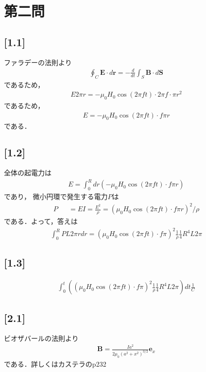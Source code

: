 \documentclass[12pt,dvipdfmx]{jsarticle}
\begin{document}
\section*{\Large{第二問}}
\subsection*{\large{[1.1]}}
ファラデーの法則より
\begin{eqnarray}
  \oint_C \bm{E}\cdot d\bm{r} = -\frac{d}{dt}\int_S \bm{B}\cdot d\bm{S}
\end{eqnarray}
であるため，
\begin{eqnarray}
  E 2\pi r= -\mu_0H_0 \cos(2\pi ft)\cdot 2\pi f \cdot \pi r^2
\end{eqnarray}
であるため，
\begin{eqnarray}
  E =  -\mu_0H_0 \cos(2\pi ft)\cdot f\pi r
\end{eqnarray}
である．
\subsection*{\large{[1.2]}}
全体の起電力は
\begin{eqnarray}
  E = \int_0^R dr\left(-\mu_0H_0 \cos(2\pi ft)\cdot f\pi r\right)
\end{eqnarray}
であり，
微小円環で発生する電力$P$は
\begin{eqnarray}
  P &&= EI =  \frac{E^2}{\rho} = \left(\mu_0H_0 \cos(2\pi ft)\cdot f\pi r\right)^2/\rho
\end{eqnarray}
である．よって，答えは
\begin{eqnarray}
  \int_0^R  PL 2\pi r dr = \left(\mu_0H_0 \cos(2\pi ft)\cdot f\pi \right)^2\frac{1}{\rho}\frac{1}{4}R^4 L 2\pi
\end{eqnarray}
\subsection*{\large{[1.3]}}
\begin{eqnarray}
  \int_0^t \left( \left(\mu_0H_0 \cos(2\pi ft)\cdot f\pi \right)^2\frac{1}{\rho}\frac{1}{4}R^4 L 2\pi\right) dt \frac{1}{C}
\end{eqnarray}

\subsection*{\large{[2.1]}}
ビオザバールの法則より
\begin{eqnarray}
  \bm{B} = \frac{I a^2}{2\mu_0(a^2+x^2)^{3/2}}\bm{e}_x
\end{eqnarray}
である．詳しくはカステラのp232
\end{document}
